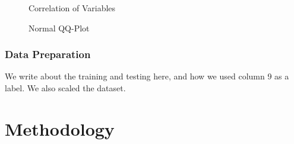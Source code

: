 \documentclass[12pt]{article}
\begin{document}
\begin{figure}[h!]
	\centering
	\begin{minipage}{0.48\textwidth}
		\caption{Correlation of Variables} 
		\label{fig:corplot}
	\end{minipage}
	\hfill %
	\centering
	\begin{minipage}{0.48\textwidth}
		\centering
		\caption{Normal QQ-Plot} 
		\label{fig:qqplot}
	\end{minipage}
\end{figure}
		
\subsubsection{Data Preparation} 

We write about the training and testing here, and how we used column 9 as a label. We also scaled the dataset.\\

\section{Methodology}
\end{document}
